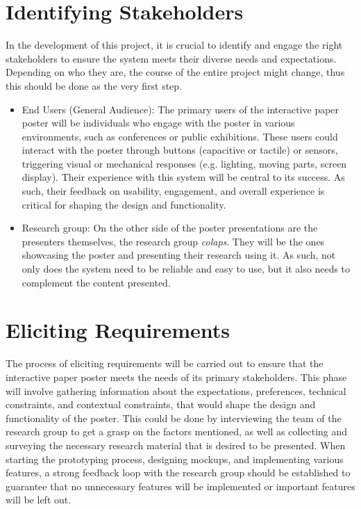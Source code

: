 \section{Identifying Stakeholders}
In the development of this project, it is crucial to identify and engage the right stakeholders to ensure the system meets their diverse needs and expectations. Depending on who they are, the course of the entire project might change, thus this should be done as the very first step.
\begin{itemize}
	\item End Users (General Audience): The primary users of the interactive paper poster will be individuals who engage with the poster in various environments, such as conferences or public exhibitions. These users could interact with the poster through buttons (capacitive or tactile) or sensors, triggering visual or mechanical responses (e.g. lighting, moving parts, screen display). Their experience with this system will be central to its success. As such, their feedback on usability, engagement, and overall experience is critical for shaping the design and functionality.
	\item  Research group: On the other side of the poster presentations are the presenters themselves, the research group \emph{colaps}. They will be the ones showcasing the poster and presenting their research using it. As such, not only does the system need to be reliable and easy to use, but it also needs to complement the content presented.
\end{itemize}

\section{Eliciting Requirements}
The process of eliciting requirements will be carried out to ensure that the interactive paper poster meets the needs of its primary stakeholders. This phase will involve gathering information about the expectations, preferences, technical constraints, and contextual constraints, that would shape the design and functionality of the poster.
This could be done by interviewing the team of the research group to get a grasp on the factors mentioned, as well as collecting and surveying the necessary research material that is desired to be presented.
When starting the prototyping process, designing mockups, and implementing various features, a strong feedback loop with the research group should be established to guarantee that no unnecessary features will be implemented or important features will be left out.


